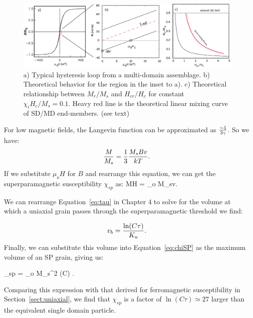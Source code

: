 \begin{figure}[htb]
\centering  \includegraphics[width=14 cm]{EPSfiles/mdloop.eps}
\caption{a) Typical hysteresis loop from a multi-domain assemblage.   b) Theoretical behavior for the region in the inset to a).  c) Theoretical relationship between $M_r/M_s$ and $H_{cr}/H_c$ for constant $\chi_iH_c/M_s = 0.1$.   Heavy red line is the theoretical linear mixing curve of SD/MD end-members.  (see text) }
\label{fig:md}
\end{figure}


For low magnetic fields, the Langevin function can be approximated as $\sim 1\over 3 \gamma$.  So we have:
$$
{M\over {M_s}} = {1\over 3}  { {M_sBv}\over {kT}}.
$$
\noindent   If we substitute $\mu_o H$ for $B$ and rearrange this equation, we can get the superparamagnetic susceptibility $\chi_{sp}$ as:
\beq
{M\over H} =   { {\mu_o M_sv}}.
\label{eq:chiSP}
\eeq

\noindent We can rearrange  Equation~\ref{eq:tau} in Chapter 4 to solve for the volume at which a uniaxial grain passes through the superparamagnetic threshold we find:  

$$
{v_b } ={{ \ln (C\tau)}\over{K_u}}.
$$
\noindent Finally, we  can substitute this volume into Equation~\ref{eq:chiSP} as the maximum volume of an SP grain, giving us:

\beq
\chi_{sp} = { {\mu_o M_s^2 \ln (C\tau)} }.
\label{eq:chiSP1}
\eeq

\noindent Comparing this expression with that derived for ferromagnetic susceptibility in Section~\ref{sect:uniaxial}, we find that $\chi_{sp}$ is a factor of $\ln(C\tau)\simeq 27$ larger than the equivalent single domain particle.  



